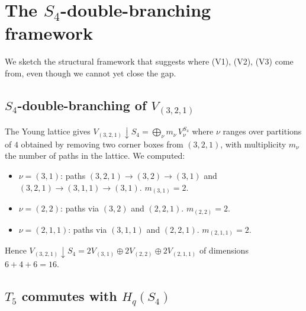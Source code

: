 \documentclass[11pt]{article}
\theoremstyle{definition}
\begin{document}
\section{The $S_4$-double-branching framework}

We sketch the structural framework that suggests where (V1), (V2), (V3) come
from, even though we cannot yet close the gap.

\subsection*{$S_4$-double-branching of $V_{(3,2,1)}$}

The Young lattice gives $V_{(3,2,1)} \downarrow S_4 = \bigoplus_{\nu} m_\nu\, V_\nu^{S_4}$ where $\nu$ ranges over partitions
of $4$ obtained by removing two corner boxes from $(3,2,1)$, with multiplicity $m_\nu$
the number of paths in the lattice. We computed:
\begin{itemize}[leftmargin=2em,topsep=0.2em,itemsep=0.1em]
\item $\nu = (3, 1)$: paths $(3,2,1) \to (3,2) \to (3,1)$ and $(3,2,1) \to (3,1,1) \to (3,1)$. $m_{(3,1)} = 2$.
\item $\nu = (2, 2)$: paths via $(3,2)$ and $(2,2,1)$. $m_{(2,2)} = 2$.
\item $\nu = (2, 1, 1)$: paths via $(3,1,1)$ and $(2,2,1)$. $m_{(2,1,1)} = 2$.
\end{itemize}
Hence $V_{(3,2,1)} \downarrow S_4 = 2 V_{(3,1)} \oplus 2 V_{(2,2)} \oplus 2 V_{(2,1,1)}$
of dimensions $6 + 4 + 6 = 16$. \checkmark

\subsection*{$T_5$ commutes with $H_q(S_4)$}
\end{document}
